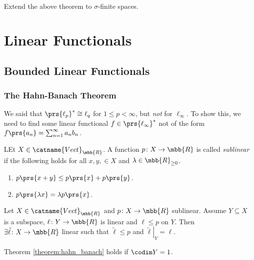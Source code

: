 \documentclass[10pt, twoside]{book}
\begin{document}
\begin{exercise}
Extend the above theorem to $\sigma$-finite spaces.
\end{exercise}

\chapter{Linear Functionals}

\section{Bounded Linear Functionals}

\subsection{The Hahn-Banach Theorem}

We said that $\prs{\ell_p}^* \cong \ell_q$ for $1 \leq p < \infty$, but \emph{not} for $\ell_\infty$.
To show this, we need to find some linear functional $f \in \prs{\ell_\infty}^*$ not of the form $f\prs{a_n} = \sum_{n=1}^{\infty} a_n b_n$.

\begin{definition}
LEt $X \in \catname{Vect}_{\mbb{R}}$. A function $p \colon X \to \mbb{R}$ is called \emph{sublinear} if the following holds for all $x,y, \in X$ and $\lambda \in \mbb{R}_{\geq 0}$.
\begin{enumerate}
\item $p\prs{x+y} \leq p\prs{x} + p\prs{y}$.
\item $p\prs{\lambda x} = \lambda p\prs{x}$.
\end{enumerate}
\end{definition}

\begin{theorem} \label{theorem:hahn_banach}
Let $X \in \catname{Vect}_{\mbb{R}}$ and $p \colon X \to \mbb{R}$ sublinear. Assume $Y \subseteq X$ is a subspace, $\ell \colon Y \to \mbb{R}$ is linear and $\ell \leq p$ on $Y$. Then $\exists \tilde{\ell} \colon X \to \mbb{R}$ linear such that $\tilde{\ell} \leq p$ and $\left. \tilde{\ell} \right|_Y = \ell$.
\end{theorem}

\begin{lemma}\label{lemma:hahn_banach_lemma}
Theorem \ref{theorem:hahn_banach} holds if $\codim Y = 1$.
\end{lemma}
\end{document}

